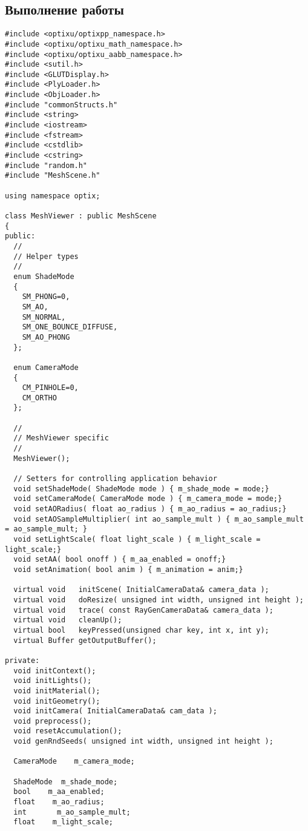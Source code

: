 \subsection{Выполнение работы}
\begin{verbatim}
#include <optixu/optixpp_namespace.h>
#include <optixu/optixu_math_namespace.h>
#include <optixu/optixu_aabb_namespace.h>
#include <sutil.h>
#include <GLUTDisplay.h>
#include <PlyLoader.h>
#include <ObjLoader.h>
#include "commonStructs.h"
#include <string>
#include <iostream>
#include <fstream>
#include <cstdlib>
#include <cstring>
#include "random.h"
#include "MeshScene.h"

using namespace optix;

class MeshViewer : public MeshScene
{
public:
  //
  // Helper types
  //
  enum ShadeMode
  {
    SM_PHONG=0,
    SM_AO,
    SM_NORMAL,
    SM_ONE_BOUNCE_DIFFUSE,
    SM_AO_PHONG
  };

  enum CameraMode
  {
    CM_PINHOLE=0,
    CM_ORTHO
  };

  //
  // MeshViewer specific  
  //
  MeshViewer();

  // Setters for controlling application behavior
  void setShadeMode( ShadeMode mode ) { m_shade_mode = mode;}
  void setCameraMode( CameraMode mode ) { m_camera_mode = mode;}
  void setAORadius( float ao_radius ) { m_ao_radius = ao_radius;}
  void setAOSampleMultiplier( int ao_sample_mult ) { m_ao_sample_mult = ao_sample_mult; }
  void setLightScale( float light_scale ) { m_light_scale = light_scale;}
  void setAA( bool onoff ) { m_aa_enabled = onoff;}
  void setAnimation( bool anim ) { m_animation = anim;}

  virtual void   initScene( InitialCameraData& camera_data );
  virtual void   doResize( unsigned int width, unsigned int height );
  virtual void   trace( const RayGenCameraData& camera_data );
  virtual void   cleanUp();
  virtual bool   keyPressed(unsigned char key, int x, int y);
  virtual Buffer getOutputBuffer();

private:
  void initContext();
  void initLights();
  void initMaterial();
  void initGeometry();
  void initCamera( InitialCameraData& cam_data );
  void preprocess();
  void resetAccumulation();
  void genRndSeeds( unsigned int width, unsigned int height );

  CameraMode    m_camera_mode;

  ShadeMode  m_shade_mode;
  bool    m_aa_enabled;
  float    m_ao_radius;
  int       m_ao_sample_mult;
  float    m_light_scale;


\end{verbatim}

